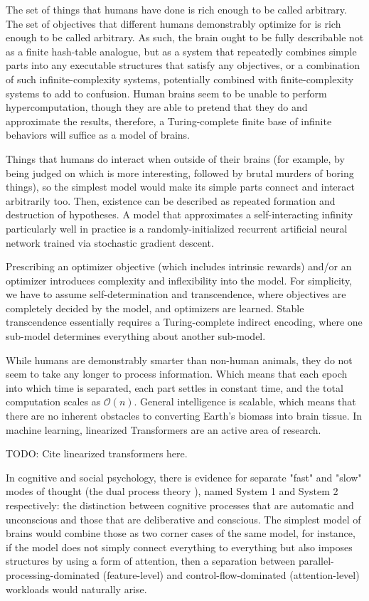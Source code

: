 \documentclass{article}
\begin{document}
The set of things that humans have done is rich enough to be called arbitrary. The set of objectives that different humans demonstrably optimize for is rich enough to be called arbitrary. As such, the brain ought to be fully describable not as a finite hash-table analogue, but as a system that repeatedly combines simple parts into any executable structures that satisfy any objectives, or a combination of such infinite-complexity systems, potentially combined with finite-complexity systems to add to confusion. Human brains seem to be unable to perform hypercomputation, though they are able to pretend that they do and approximate the results, therefore, a Turing-complete finite base of infinite behaviors will suffice as a model of brains.

Things that humans do interact when outside of their brains (for example, by being judged on which is more interesting, followed by brutal murders of boring things), so the simplest model would make its simple parts connect and interact arbitrarily too. Then, existence can be described as repeated formation and destruction of hypotheses. A model that approximates a self-interacting infinity particularly well in practice is a randomly-initialized recurrent artificial neural network trained via stochastic gradient descent.

Prescribing an optimizer objective (which includes intrinsic rewards) and/or an optimizer introduces complexity and inflexibility into the model. For simplicity, we have to assume self-determination and transcendence, where objectives are completely decided by the model, and optimizers are learned. Stable transcendence essentially requires a Turing-complete indirect encoding, where one sub-model determines everything about another sub-model.

While humans are demonstrably smarter than non-human animals, they do not seem to take any longer to process information. Which means that each epoch into which time is separated, each part settles in constant time, and the total computation scales as $\mathcal{O}(n)$. General intelligence is scalable, which means that there are no inherent obstacles to converting Earth's biomass into brain tissue. In machine learning, linearized Transformers are an active area of research.

    TODO: Cite linearized transformers here.

In cognitive and social psychology, there is evidence for separate "fast" and "slow" modes of thought (the dual process theory \cite{doi:10.1146/annurev.psych.59.103006.093629}), named System 1 and System 2 respectively: the distinction between cognitive processes that are automatic and unconscious and those that are deliberative and conscious. The simplest model of brains would combine those as two corner cases of the same model, for instance, if the model does not simply connect everything to everything but also imposes structures by using a form of attention, then a separation between parallel-processing-dominated (feature-level) and control-flow-dominated (attention-level) workloads would naturally arise.
\end{document}
